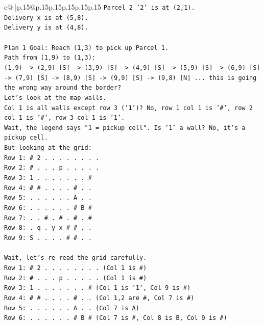 \documentclass{article}
\begin{document}
{\begin{supertabular}{c@{$\;$}|p{.15\linewidth}@{}p{.15\linewidth}p{.15\linewidth}p{.15\linewidth}p{.15\linewidth}p{.15\linewidth}}
{{{\texttt{Parcel 2 '2' is at (2,1).} \\
\texttt{Delivery x is at (5,8).} \\
\texttt{Delivery y is at (4,8).} \\
\\ 
\texttt{Plan 1 Goal: Reach (1,3) to pick up Parcel 1.} \\
\texttt{Path from (1,9) to (1,3):} \\
\texttt{(1,9) {-}> (2,9) {[}S{]} {-}> (3,9) {[}S{]} {-}> (4,9) {[}S{]} {-}> (5,9) {[}S{]} {-}> (6,9) {[}S{]} {-}> (7,9) {[}S{]} {-}> (8,9) {[}S{]} {-}> (9,9) {[}S{]} {-}> (9,8) {[}N{]} ... this is going the wrong way around the border?} \\
\texttt{Let's look at the map walls.} \\
\texttt{Col 1 is all walls except row 3 ('1')? No, row 1 col 1 is '\#', row 2 col 1 is '\#', row 3 col 1 is '1'.} \\
\texttt{Wait, the legend says "1 = pickup cell". Is '1' a wall? No, it's a pickup cell.} \\
\texttt{But looking at the grid:} \\
\texttt{Row 1: \# 2 . . . . . . . .} \\
\texttt{Row 2: \# . . . p . . . . .} \\
\texttt{Row 3: 1 . . . . . . . \#} \\
\texttt{Row 4: \# \# . . . . \# . .} \\
\texttt{Row 5: . . . . . . A . .} \\
\texttt{Row 6: . . . . . . \# B \#} \\
\texttt{Row 7: . . \# . \# . \# . \#} \\
\texttt{Row 8: . q . y x \# \# . .} \\
\texttt{Row 9: S . . . . \# \# . .} \\
\\ 
\texttt{Wait, let's re{-}read the grid carefully.} \\
\texttt{Row 1: \# 2 . . . . . . . . (Col 1 is \#)} \\
\texttt{Row 2: \# . . . p . . . . . (Col 1 is \#)} \\
\texttt{Row 3: 1 . . . . . . . \# (Col 1 is '1', Col 9 is \#)} \\
\texttt{Row 4: \# \# . . . . \# . . (Col 1,2 are \#, Col 7 is \#)} \\
\texttt{Row 5: . . . . . . A . . (Col 7 is A)} \\
\texttt{Row 6: . . . . . . \# B \# (Col 7 is \#, Col 8 is B, Col 9 is \#)} \\
}}}
\end{supertabular}}
\end{document}
